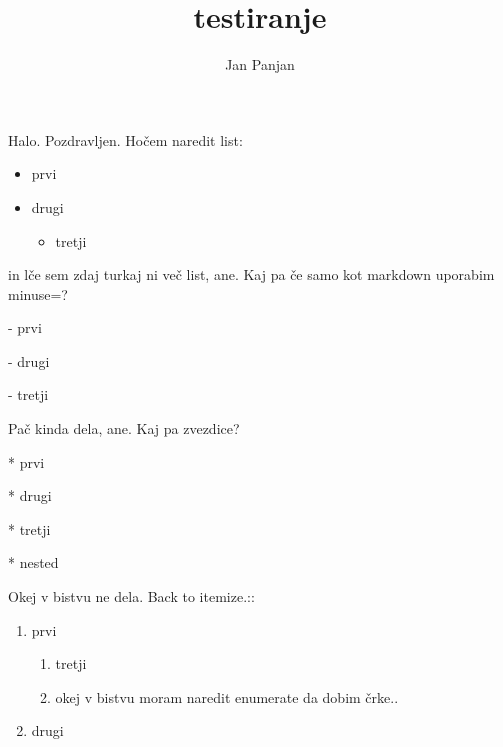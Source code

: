 \documentclass{article}
\title{testiranje}
\author{Jan Panjan}
\begin{document}
\maketitle

Halo. Pozdravljen. Hočem naredit list:

\begin{itemize}
	\item prvi
	\item drugi
		\begin{itemize}
			\item tretji
		\end{itemize}
\end{itemize}

in lče sem zdaj turkaj ni več list, ane. Kaj pa če samo kot
markdown uporabim minuse=?

- prvi

- drugi

- tretji

Pač kinda dela, ane. Kaj pa zvezdice?

* prvi

* drugi

* tretji

	* nested

Okej v bistvu ne dela. Back to itemize.::

\begin{enumerate}
	\item prvi
		\begin{enumerate}
			\item tretji
			\item okej v bistvu moram naredit enumerate da dobim črke..
		\end{enumerate}
	\item drugi
\end{enumerate}
\end{document}
